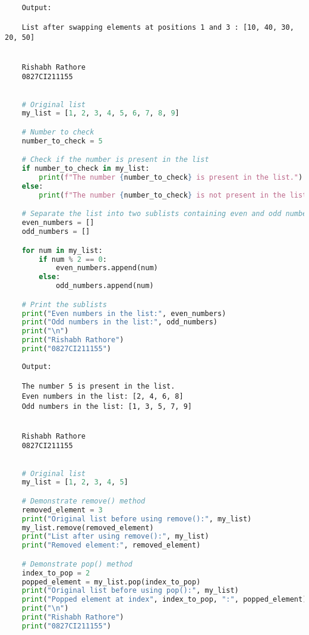 \documentclass{report}
\begin{document}
\begin{verbatim}
	
	Output:

	List after swapping elements at positions 1 and 3 : [10, 40, 30, 20, 50]


	Rishabh Rathore
	0827CI211155
\end{verbatim}
\newpage


\sol{}
\begin{lstlisting}[language=Python]

	# Original list
	my_list = [1, 2, 3, 4, 5, 6, 7, 8, 9]

	# Number to check
	number_to_check = 5

	# Check if the number is present in the list
	if number_to_check in my_list:
		print(f"The number {number_to_check} is present in the list.")
	else:
		print(f"The number {number_to_check} is not present in the list.")

	# Separate the list into two sublists containing even and odd numbers
	even_numbers = []
	odd_numbers = []

	for num in my_list:
		if num % 2 == 0:
			even_numbers.append(num)
		else:
			odd_numbers.append(num)

	# Print the sublists
	print("Even numbers in the list:", even_numbers)
	print("Odd numbers in the list:", odd_numbers)
	print("\n")
	print("Rishabh Rathore")
	print("0827CI211155")
\end{lstlisting}

\begin{verbatim}
	Output:

	The number 5 is present in the list.
	Even numbers in the list: [2, 4, 6, 8]
	Odd numbers in the list: [1, 3, 5, 7, 9]
	
	
	Rishabh Rathore
	0827CI211155
\end{verbatim}
\newpage


\sol{}
\begin{lstlisting}[language=Python]

	# Original list
	my_list = [1, 2, 3, 4, 5]

	# Demonstrate remove() method
	removed_element = 3
	print("Original list before using remove():", my_list)
	my_list.remove(removed_element)
	print("List after using remove():", my_list)
	print("Removed element:", removed_element)

	# Demonstrate pop() method
	index_to_pop = 2
	popped_element = my_list.pop(index_to_pop)
	print("Original list before using pop():", my_list)
	print("Popped element at index", index_to_pop, ":", popped_element)
	print("\n")
	print("Rishabh Rathore")
	print("0827CI211155")

\end{lstlisting}
\end{document}
